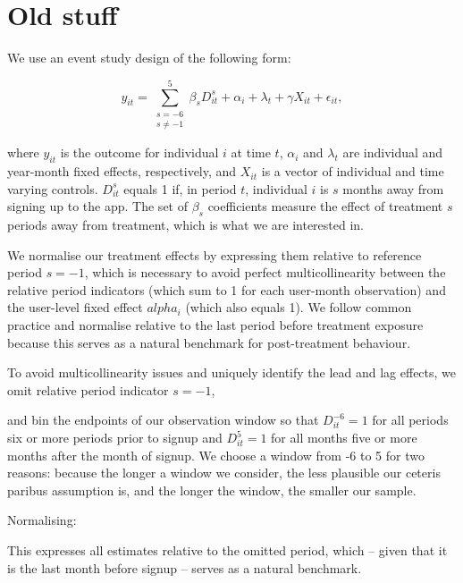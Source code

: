 \section{Old stuff}%
\label{sec:old_stuff}











We use an event study design of the following form:

\begin{equation}
\label{eq:dynamic_twfe}
    y_{it} = \sum^{5}_{\substack{s=-6 \\
     s\neq-1}} \beta_s D_{it}^s + \alpha_i + \lambda_t + \gamma X_{it} + \epsilon_{it},
\end{equation}

where $y_{it}$ is the outcome for individual $i$ at time $t$, $\alpha_i$ and
$\lambda_t$ are individual and year-month fixed effects, respectively, and
$X_{it}$ is a vector of individual and time varying controls. $D_{it}^s$ equals
1 if, in period $t$, individual $i$ is $s$ months away from signing up to the
app. The set of $\beta_s$ coefficients measure the effect of treatment $s$
periods away from treatment, which is what we are interested in.

We normalise our treatment effects by expressing them relative to reference
period $s = -1$, which is necessary to avoid perfect multicollinearity between
the relative period indicators (which sum to 1 for each user-month observation)
and the user-level fixed effect $alpha_i$ (which also equals 1). We follow
common practice and normalise relative to the last period before treatment
exposure because this serves as a natural benchmark for post-treatment
behaviour.

To avoid multicollinearity issues and uniquely identify the lead and lag
effects, we omit relative period indicator $s = -1$,

and bin the endpoints of our observation window so that $D_{it}^{-6} = 1$ for
all periods six or more periods prior to signup and $D_{it}^{5} = 1$ for all
months five or more months after the month of signup. We choose a window from
-6 to 5 for two reasons: because the longer a window we consider, the less
plausible our ceteris paribus assumption is, and the longer the window, the
smaller our sample.


Normalising: 

This expresses all estimates relative to the omitted
period, which -- given that it is the last month before signup -- serves as a
natural benchmark.

